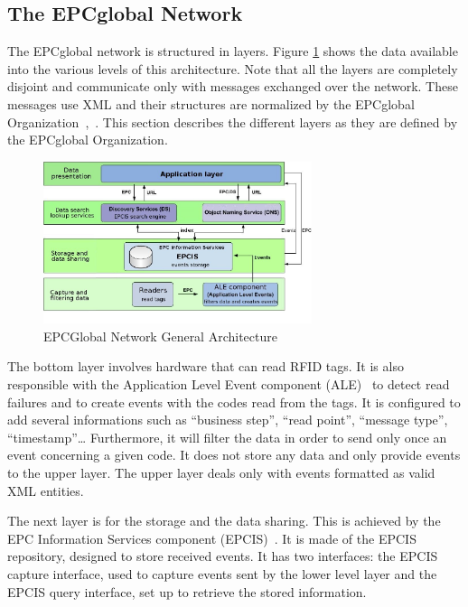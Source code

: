 \documentclass[a4paper]{llncs}
\begin{document}
\subsection{The EPCglobal Network}

The EPCglobal network is structured in layers. Figure \ref{epcglobalarchi} shows the data available
into the various levels of this architecture. Note that all the layers are completely disjoint and
communicate only with messages exchanged over the network. These messages use XML and their
structures are normalized by the EPCglobal Organization~\cite{dsconcept},~\cite{epcis}.
This section describes the different layers as they are defined by the EPCglobal Organization. 

\begin{figure}[htb]
\centering
\includegraphics[width=0.7\textwidth]{img/epcglobalarchi2.jpg}
\caption{EPCGlobal Network General Architecture}
\label{epcglobalarchi}
\end{figure}

The bottom layer involves hardware that can read RFID tags. It is also
responsible with the Application Level Event component (ALE)~\cite{ale} to detect read
failures and to create events with the codes read from the tags. It is configured to add several
informations such as ``business step'', ``read point'', ``message type'',
``timestamp''\ldots{} Furthermore, it will filter the data in order to send only
once an event concerning a given code. It does
not store any data and only provide events to the upper layer. The upper layer
deals only with events formatted as valid XML entities. 

The next layer is for the storage and the data sharing. This is achieved by the EPC
Information Services component (EPCIS)~\cite{epcis}. It is made of the EPCIS repository,
designed to store received events. It has two interfaces: the EPCIS capture
interface, used to capture events sent by the lower level layer and the EPCIS
query interface, set up to retrieve the stored information.
\end{document}
